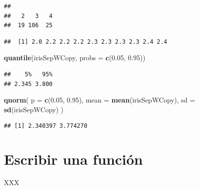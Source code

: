 \documentclass[]{book}
\newenvironment{Shaded}{\begin{snugshade}}{\end{snugshade}}
\newcommand{\KeywordTok}[1]{\textcolor[rgb]{0.13,0.29,0.53}{\textbf{#1}}}
\newcommand{\DataTypeTok}[1]{\textcolor[rgb]{0.13,0.29,0.53}{#1}}
\newcommand{\DecValTok}[1]{\textcolor[rgb]{0.00,0.00,0.81}{#1}}
\newcommand{\FloatTok}[1]{\textcolor[rgb]{0.00,0.00,0.81}{#1}}
\newcommand{\StringTok}[1]{\textcolor[rgb]{0.31,0.60,0.02}{#1}}
\newcommand{\OperatorTok}[1]{\textcolor[rgb]{0.81,0.36,0.00}{\textbf{#1}}}
\newcommand{\NormalTok}[1]{#1}
\begin{document}
\begin{verbatim}
## 
##   2   3   4 
##  19 106  25
\end{verbatim}

\begin{Shaded}
\end{Shaded}

\begin{verbatim}
##  [1] 2.0 2.2 2.2 2.2 2.3 2.3 2.3 2.3 2.4 2.4
\end{verbatim}

\begin{Shaded}
\begin{Highlighting}[]
\KeywordTok{quantile}\NormalTok{(irisSepWCopy, }\DataTypeTok{probs =} \KeywordTok{c}\NormalTok{(}\FloatTok{0.05}\NormalTok{, }\FloatTok{0.95}\NormalTok{))}
\end{Highlighting}
\end{Shaded}

\begin{verbatim}
##    5%   95% 
## 2.345 3.800
\end{verbatim}

\begin{Shaded}
\begin{Highlighting}[]
\KeywordTok{qnorm}\NormalTok{(}
  \DataTypeTok{p =} \KeywordTok{c}\NormalTok{(}\FloatTok{0.05}\NormalTok{, }\FloatTok{0.95}\NormalTok{), }
  \DataTypeTok{mean =} \KeywordTok{mean}\NormalTok{(irisSepWCopy), }
  \DataTypeTok{sd =} \KeywordTok{sd}\NormalTok{(irisSepWCopy)}
\NormalTok{)}
\end{Highlighting}
\end{Shaded}

\begin{verbatim}
## [1] 2.340397 3.774270
\end{verbatim}

\section{Escribir una función}\label{escribir-una-funcion}

XXX
\end{document}
